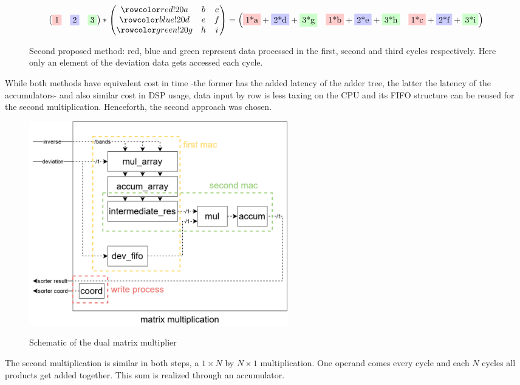\begin{figure}[h]%
\[
\begin{pmatrix}
\rb1 & \bb 2 & \gb 3
\end{pmatrix}
*
\begin{pmatrix}
\rr a & b & c \\ 
\br d & e & f \\ 
\gr g & h & i
\end{pmatrix}
=
\begin{pmatrix}
\rb{1*a}+\bb{2*d}+\gb{3*g} & \rb{1*b}+\bb{2*e}+\gb{3*h} & \rb{1*c}+\bb{2*f}+\gb{3*i}
\end{pmatrix} 
\]
\caption[Second proposed method for the matrix multiplication]{Second proposed method: red, blue and green represent data processed in the first, second and third cycles respectively. Here only an element of the deviation data gets accessed each cycle.}
\end{figure}

While both methods have equivalent cost in time -the former has the added latency of the adder tree, the latter the latency of the accumulators- and also similar cost in DSP usage, data input by row is less taxing on the CPU and its FIFO structure can be reused for the second multiplication. Henceforth, the second approach was chosen.


\begin{figure}[h!]
\centering\textbf{
\includegraphics[height=3.5in]{figures/mult.png}}
\caption{Schematic of the dual matrix multiplier}
  \label{fig:mult}
\end{figure}

The second multiplication is similar in both steps, a \(1 \times N\) by \(N \times 1\) multiplication. One operand comes every cycle and each \(N\) cycles all products get added together. This sum is realized through an accumulator.\\

